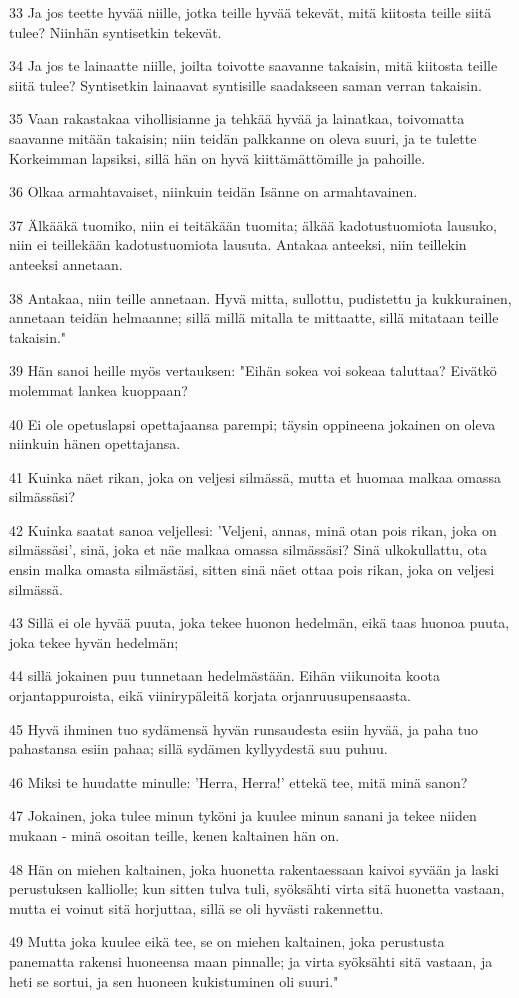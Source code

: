 \par 33 Ja jos teette hyvää niille, jotka teille hyvää tekevät, mitä kiitosta teille siitä tulee? Niinhän syntisetkin tekevät.
\par 34 Ja jos te lainaatte niille, joilta toivotte saavanne takaisin, mitä kiitosta teille siitä tulee? Syntisetkin lainaavat syntisille saadakseen saman verran takaisin.
\par 35 Vaan rakastakaa vihollisianne ja tehkää hyvää ja lainatkaa, toivomatta saavanne mitään takaisin; niin teidän palkkanne on oleva suuri, ja te tulette Korkeimman lapsiksi, sillä hän on hyvä kiittämättömille ja pahoille.
\par 36 Olkaa armahtavaiset, niinkuin teidän Isänne on armahtavainen.
\par 37 Älkääkä tuomiko, niin ei teitäkään tuomita; älkää kadotustuomiota lausuko, niin ei teillekään kadotustuomiota lausuta. Antakaa anteeksi, niin teillekin anteeksi annetaan.
\par 38 Antakaa, niin teille annetaan. Hyvä mitta, sullottu, pudistettu ja kukkurainen, annetaan teidän helmaanne; sillä millä mitalla te mittaatte, sillä mitataan teille takaisin."
\par 39 Hän sanoi heille myös vertauksen: "Eihän sokea voi sokeaa taluttaa? Eivätkö molemmat lankea kuoppaan?
\par 40 Ei ole opetuslapsi opettajaansa parempi; täysin oppineena jokainen on oleva niinkuin hänen opettajansa.
\par 41 Kuinka näet rikan, joka on veljesi silmässä, mutta et huomaa malkaa omassa silmässäsi?
\par 42 Kuinka saatat sanoa veljellesi: 'Veljeni, annas, minä otan pois rikan, joka on silmässäsi', sinä, joka et näe malkaa omassa silmässäsi? Sinä ulkokullattu, ota ensin malka omasta silmästäsi, sitten sinä näet ottaa pois rikan, joka on veljesi silmässä.
\par 43 Sillä ei ole hyvää puuta, joka tekee huonon hedelmän, eikä taas huonoa puuta, joka tekee hyvän hedelmän;
\par 44 sillä jokainen puu tunnetaan hedelmästään. Eihän viikunoita koota orjantappuroista, eikä viinirypäleitä korjata orjanruusupensaasta.
\par 45 Hyvä ihminen tuo sydämensä hyvän runsaudesta esiin hyvää, ja paha tuo pahastansa esiin pahaa; sillä sydämen kyllyydestä suu puhuu.
\par 46 Miksi te huudatte minulle: 'Herra, Herra!' ettekä tee, mitä minä sanon?
\par 47 Jokainen, joka tulee minun tyköni ja kuulee minun sanani ja tekee niiden mukaan - minä osoitan teille, kenen kaltainen hän on.
\par 48 Hän on miehen kaltainen, joka huonetta rakentaessaan kaivoi syvään ja laski perustuksen kalliolle; kun sitten tulva tuli, syöksähti virta sitä huonetta vastaan, mutta ei voinut sitä horjuttaa, sillä se oli hyvästi rakennettu.
\par 49 Mutta joka kuulee eikä tee, se on miehen kaltainen, joka perustusta panematta rakensi huoneensa maan pinnalle; ja virta syöksähti sitä vastaan, ja heti se sortui, ja sen huoneen kukistuminen oli suuri."

